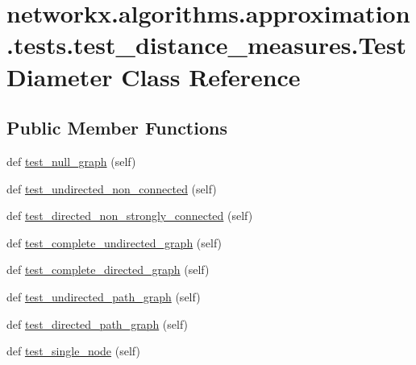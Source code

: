 \hypertarget{classnetworkx_1_1algorithms_1_1approximation_1_1tests_1_1test__distance__measures_1_1TestDiameter}{}\section{networkx.\+algorithms.\+approximation.\+tests.\+test\+\_\+distance\+\_\+measures.\+Test\+Diameter Class Reference}
\label{classnetworkx_1_1algorithms_1_1approximation_1_1tests_1_1test__distance__measures_1_1TestDiameter}
\subsection*{Public Member Functions}
\begin{DoxyCompactItemize}
\item 
def \hyperlink{classnetworkx_1_1algorithms_1_1approximation_1_1tests_1_1test__distance__measures_1_1TestDiameter_acd0794fec016dda3a1eb41d22a8a09a5}{test\+\_\+null\+\_\+graph} (self)
\item 
def \hyperlink{classnetworkx_1_1algorithms_1_1approximation_1_1tests_1_1test__distance__measures_1_1TestDiameter_a1e81f39ef1dc86dda6694c122be0764b}{test\+\_\+undirected\+\_\+non\+\_\+connected} (self)
\item 
def \hyperlink{classnetworkx_1_1algorithms_1_1approximation_1_1tests_1_1test__distance__measures_1_1TestDiameter_a8c727a36a59ebd36094a8f16d6993a98}{test\+\_\+directed\+\_\+non\+\_\+strongly\+\_\+connected} (self)
\item 
def \hyperlink{classnetworkx_1_1algorithms_1_1approximation_1_1tests_1_1test__distance__measures_1_1TestDiameter_a3b6bad08355370b94e24907ba02220bb}{test\+\_\+complete\+\_\+undirected\+\_\+graph} (self)
\item 
def \hyperlink{classnetworkx_1_1algorithms_1_1approximation_1_1tests_1_1test__distance__measures_1_1TestDiameter_a53f0f11a890b253442bbbd0aaeb78fb9}{test\+\_\+complete\+\_\+directed\+\_\+graph} (self)
\item 
def \hyperlink{classnetworkx_1_1algorithms_1_1approximation_1_1tests_1_1test__distance__measures_1_1TestDiameter_a8e75f665416a0c841fd2177648a161db}{test\+\_\+undirected\+\_\+path\+\_\+graph} (self)
\item 
def \hyperlink{classnetworkx_1_1algorithms_1_1approximation_1_1tests_1_1test__distance__measures_1_1TestDiameter_a7c6f451434ee02f5011615487c713c0b}{test\+\_\+directed\+\_\+path\+\_\+graph} (self)
\item 
def \hyperlink{classnetworkx_1_1algorithms_1_1approximation_1_1tests_1_1test__distance__measures_1_1TestDiameter_a9c912a7310e9b9bfea3ad1d10643661f}{test\+\_\+single\+\_\+node} (self)
\end{DoxyCompactItemize}


